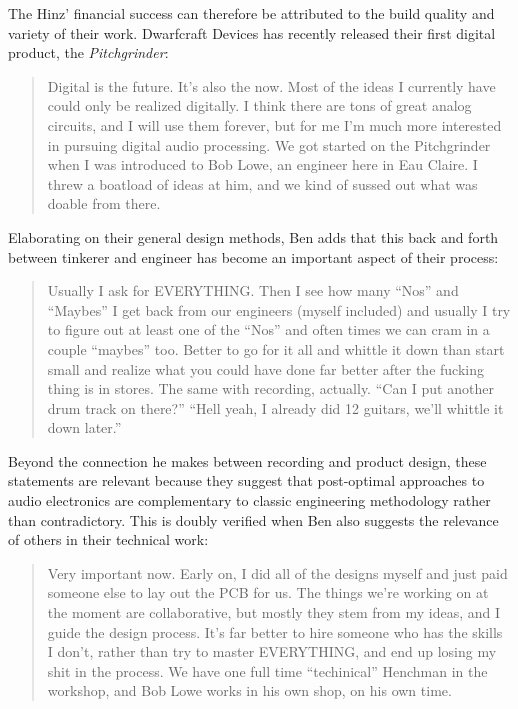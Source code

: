 The Hinz' financial success can therefore be attributed to the build quality and variety of their work. Dwarfcraft Devices has recently released their first digital product, the \textit{Pitchgrinder}:  

\begin{quote}
	
Digital is the future. It's also the now. Most of the ideas I currently have could only be realized digitally. I think there are tons of great analog circuits, and I will use them forever, but for me I'm much more interested in pursuing digital audio processing. We got started on the Pitchgrinder when I was introduced to Bob Lowe, an engineer here in Eau Claire. I threw a boatload of ideas at him, and we kind of sussed out what was doable from there.
\end{quote}

Elaborating on their general design methods, Ben adds that this back and forth between tinkerer and engineer
 	has become an important aspect of their process: 

\begin{quote}
 	Usually I ask for EVERYTHING. Then I see how many “Nos” and “Maybes” I get back from our engineers (myself included) and usually I try to figure out at least one of the “Nos” and often times we can cram in a couple “maybes” too. Better to go for it all and whittle it down than start small and realize what you could have done far better after the fucking thing is in stores. The same with recording, actually. “Can I put another drum track on there?” “Hell yeah, I already did 12 guitars, we’ll whittle it down later.”
 \end{quote}
 
Beyond the connection he makes between recording and product design, these statements are relevant because they suggest that post-optimal approaches to audio electronics are complementary to classic engineering methodology rather than contradictory. This is doubly verified when Ben also suggests the relevance of others in their technical work: 

\begin{quote}
	Very important now. Early on, I did all of the designs myself and just paid someone else to lay out the PCB for us. The things we’re working on at the moment are collaborative, but mostly they stem from my ideas, and I guide the design process. It’s far better to hire someone who has the skills I don’t, rather than try to master EVERYTHING, and end up losing my shit in the process. We have one full time “techinical” Henchman in the workshop, and Bob Lowe works in his own shop, on his own time.
\end{quote}

